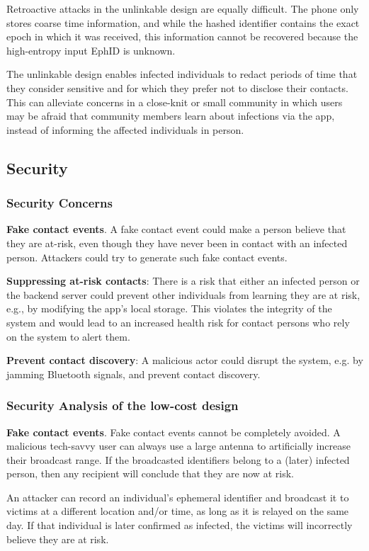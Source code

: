 \documentclass[10.8pt,a4paper]{article}
\begin{document}
Retroactive attacks in the unlinkable design are equally difficult. The phone only stores coarse time information, and while the hashed identifier contains the exact epoch in which it was received, this information cannot be recovered because the high-entropy input EphID is unknown.

The unlinkable design enables infected individuals to redact periods of time that they consider sensitive and for which they prefer not to disclose their contacts. This can alleviate concerns in a close-knit or small community in which users may be afraid that community members learn about infections via the app, instead of informing the affected individuals in person.

\subsection{Security}
\subsubsection{Security Concerns}
\textbf{Fake contact events}. A fake contact event could make a person believe that they are at-risk, even though they have never been in contact with an infected person. Attackers could try to generate such fake contact events.

\textbf{Suppressing at-risk contacts}: There is a risk that either an infected person or the backend server could prevent other individuals from learning they are at risk, e.g., by modifying the app’s local storage. This violates the integrity of the system and would lead to an increased health risk for contact persons who rely on the system to alert them.

\textbf{Prevent contact discovery}: A malicious actor could disrupt the system, e.g. by jamming Bluetooth signals, and prevent contact discovery.

\subsubsection{Security Analysis of the low-cost design}

\textbf{Fake contact events}. Fake contact events cannot be completely avoided. A malicious tech-savvy user can always use a large antenna to artificially increase their broadcast range. If the broadcasted identifiers belong to a (later) infected person, then any recipient will conclude that they are now at risk.

An attacker can record an individual’s ephemeral identifier and broadcast it to victims at a different location and/or time, as long as it is relayed on the same day. If that individual is later confirmed as infected, the victims will incorrectly believe they are at risk.
\end{document}
